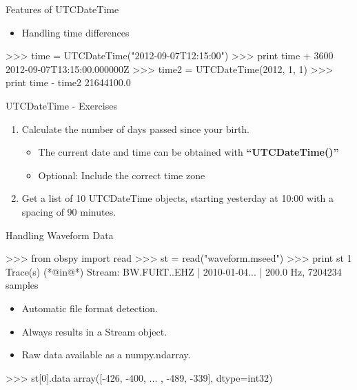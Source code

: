 \documentclass[handout]{beamer}
\begin{document}
\begin{frame}{Features of UTCDateTime}
    \begin{itemize}
        \item Handling time differences
    \end{itemize}

\begin{myColorBox}{0.95}{}
\begin{python}
>>> time = UTCDateTime("2012-09-07T12:15:00")
>>> print time + 3600
2012-09-07T13:15:00.000000Z
>>> time2 = UTCDateTime(2012, 1, 1)
>>> print time - time2
21644100.0
\end{python}
\end{myColorBox}

\end{frame}


\begin{frame}{UTCDateTime - Exercises}
    \begin{enumerate}
        \item Calculate the number of days passed since your birth. \\
            \begin{itemize}
                \item The current date and time can be obtained with \textbf{``UTCDateTime()''}
                \item Optional: Include the correct time zone
            \end{itemize}
        \item Get a list of 10 UTCDateTime objects, starting yesterday at 10:00 with a spacing of 90 minutes.
    \end{enumerate}


\end{frame}





\begin{frame}{Handling Waveform Data}
\begin{myColorBox}{0.95}{}
\begin{python}
>>> from obspy import read
>>> st = read("waveform.mseed")
>>> print st
1 Trace(s) (*@in@*) Stream:
BW.FURT..EHZ | 2010-01-04... | 200.0 Hz, 7204234 samples
\end{python}
\end{myColorBox}
\begin{itemize}
    \item Automatic file format detection.
    \item Always results in a Stream object.
    \item Raw data available as a numpy.ndarray.
\end{itemize}
\begin{myColorBox}{0.95}{}
\begin{python}
>>> st[0].data
array([-426, -400, ... , -489, -339], dtype=int32)
\end{python}
\end{myColorBox}
\end{frame}
\end{document}
